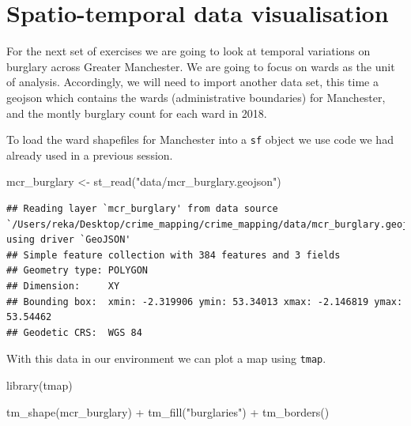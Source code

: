 \documentclass[
]{book}
\newenvironment{Shaded}{\begin{snugshade}}{\end{snugshade}}
\newcommand{\FunctionTok}[1]{\textcolor[rgb]{0.00,0.00,0.00}{#1}}
\newcommand{\NormalTok}[1]{#1}
\newcommand{\OtherTok}[1]{\textcolor[rgb]{0.56,0.35,0.01}{#1}}
\newcommand{\SpecialCharTok}[1]{\textcolor[rgb]{0.00,0.00,0.00}{#1}}
\newcommand{\StringTok}[1]{\textcolor[rgb]{0.31,0.60,0.02}{#1}}
\begin{document}
\hypertarget{spatio-temporal-data-visualisation}{%
\section{Spatio-temporal data visualisation}\label{spatio-temporal-data-visualisation}}

For the next set of exercises we are going to look at temporal variations on burglary across Greater Manchester. We are going to focus on wards as the unit of analysis. Accordingly, we will need to import another data set, this time a geojson which contains the wards (administrative boundaries) for Manchester, and the montly burglary count for each ward in 2018.

To load the ward shapefiles for Manchester into a \texttt{sf} object we use code we had already used in a previous session.

\begin{Shaded}
\begin{Highlighting}[]
\NormalTok{mcr\_burglary }\OtherTok{\textless{}{-}} \FunctionTok{st\_read}\NormalTok{(}\StringTok{"data/mcr\_burglary.geojson"}\NormalTok{)}
\end{Highlighting}
\end{Shaded}

\begin{verbatim}
## Reading layer `mcr_burglary' from data source `/Users/reka/Desktop/crime_mapping/crime_mapping/data/mcr_burglary.geojson' using driver `GeoJSON'
## Simple feature collection with 384 features and 3 fields
## Geometry type: POLYGON
## Dimension:     XY
## Bounding box:  xmin: -2.319906 ymin: 53.34013 xmax: -2.146819 ymax: 53.54462
## Geodetic CRS:  WGS 84
\end{verbatim}

With this data in our environment we can plot a map using \texttt{tmap}.

\begin{Shaded}
\begin{Highlighting}[]
\FunctionTok{library}\NormalTok{(tmap)}

\FunctionTok{tm\_shape}\NormalTok{(mcr\_burglary) }\SpecialCharTok{+} 
  \FunctionTok{tm\_fill}\NormalTok{(}\StringTok{"burglaries"}\NormalTok{) }\SpecialCharTok{+}
  \FunctionTok{tm\_borders}\NormalTok{() }
\end{Highlighting}
\end{Shaded}
\end{document}
